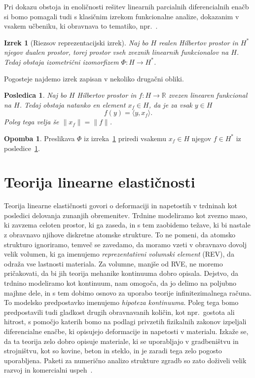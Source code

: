 \documentclass[12pt,a4paper,twoside]{article}
\theoremstyle{definition} %
\newtheorem{opomba}[definicija]{Opomba}
\theoremstyle{plain} %
\newtheorem{izrek}[definicija]{Izrek}
\newtheorem{posledica}[definicija]{Posledica}
\numberwithin{equation}{section}
\newcommand{\R}{\mathbb R}
\let\oldsection\section
\def\section{\cleardoublepage\oldsection}
\begin{document}
Pri dokazu obstoja in enoličnosti rešitev linearnih parcialnih diferencialnih enačb si bomo
pomagali tudi s klasičnim izrekom funkcionalne analize, dokazanim v vsakem učbeniku, ki obravnava to
tematiko, npr.~\cite[str.\ 188, izrek 3.8-1]{kreyszig1989introductory}.
\begin{izrek}[Riezsov reprezentacijski izrek]
  \label{izr:riesz-general}
  Naj bo $H$ realen Hilbertov prostor in $H^\ast$ njegov dualen prostor, torej
  prostor vseh zveznih linearnih funkcionalov na $H$. Tedaj obstaja izometrični
  izomorfizem $\Phi\colon H\to H^\ast$.
\end{izrek}
Pogosteje najdemo izrek zapisan v nekoliko drugačni obliki.
\begin{posledica}
  \label{izr:riesz-useful}
  Naj bo $H$ Hilbertov prostor in $f\colon H\to\R$ zvezen linearen funkcional na $H$.
  Tedaj obstaja natanko en element $x_f \in H$, da je za vsak $y \in H$
  \begin{equation}
    f(y) = \langle y, x_f \rangle.
  \end{equation}
  Poleg tega velja še $\|x_f\| = \|f\|$.
\end{posledica}
\begin{opomba}
  Preslikava $\Phi$ iz izreka~\ref{izr:riesz-general} priredi vsakemu $x_f \in
  H$ njegov $f \in H^\ast$ iz posledice~\ref{izr:riesz-useful}.
\end{opomba}

\section{Teorija linearne elastičnosti}
\label{sec:mehanika}
Teorija linearne elastičnosti govori o deformaciji in napetostih v trdninah kot posledici delovanja
zunanjih obremenitev. Trdnine modeliramo kot zvezno maso, ki zavzema celoten prostor, ki ga zaseda,
in s tem zaobidemo težave, ki bi nastale z obravnavo njihove diskretne atomske strukture. To ne
pomeni, da atomsko strukturo ignoriramo, temveč se zavedamo, da moramo vzeti v obravnavo dovolj
velik volumen, ki ga imenujemo \emph{reprezentativni volumski element} (REV), da odraža vse
lastnosti materiala. Za volumne, manjše od RVE, ne moremo pričakovati, da bi jih teorija mehanike
kontinuuma dobro opisala. Dejstvo, da trdnino modeliramo kot kontinuum, nam omogoča, da jo delimo na
poljubno majhne dele, in s tem dobimo osnovo za uporabo teorije infinitezimalnega računa. To
modelsko predpostavko imenujemo \emph{hipoteza kontinuuma}. Poleg tega bomo predpostavili tudi
gladkost drugih obravnavanih količin, kot npr.~gostota ali hitrost, s pomočjo katerih bomo na
podlagi privzetih fizikalnih zakonov izpeljali diferencialne enačbe, ki opisujejo deformacije in
napetosti v materialu. Izkaže se, da ta teorija zelo dobro opisuje materiale, ki se uporabljajo v
gradbeništvu in strojništvu, kot so kovine, beton in steklo, in je zaradi tega zelo pogosto
uporabljena. Paketi za numerično analizo strukture zgradb so zato doživeli velik razvoj in komercialni
uspeh~\cite{solidworks,hibbitt2001abaqus,autodesk}.
\end{document}
